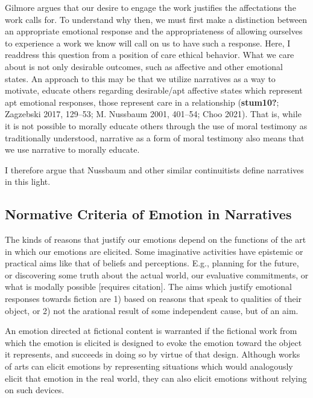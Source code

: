 \documentclass[12pt]{book}
\theoremstyle{definition}
\theoremstyle{remark}
\begin{document}
Gilmore argues that our desire to engage the work justifies the affectations the work calls for. To understand why then, we must first make a distinction between an appropriate emotional response and the appropriateness of allowing ourselves to experience a work we know will call on us to have such a response. Here, I readdress this question from a position of care ethical behavior. What we care about is not only desirable outcomes, such as affective and other emotional states. An approach to this may be that we utilize narratives as a way to motivate, educate others regarding desirable/apt affective states which represent apt emotional responses, those represent care in a relationship (\textbf{stum10?}; Zagzebski 2017, 129--53; M. Nussbaum 2001, 401--54; Choo 2021). That is, while it is not possible to morally educate others through the use of moral testimony as traditionally understood, narrative as a form of moral testimony also means that we use narrative to morally educate.

I therefore argue that Nussbaum and other similar continuitists define narratives in this light.

\subsection*{Normative Criteria of Emotion in Narratives}\label{normative-criteria-of-emotion-in-narratives}

The kinds of reasons that justify our emotions depend on the functions of the art in which our emotions are elicited. Some imaginative activities have epistemic or practical aims like that of beliefs and perceptions. E.g., planning for the future, or discovering some truth about the actual world, our evaluative commitments, or what is modally possible {[}requires citation{]}. The aims which justify emotional responses towards fiction are 1) based on reasons that speak to qualities of their object, or 2) not the arational result of some independent cause, but of an aim.

An emotion directed at fictional content is warranted if the fictional work from which the emotion is elicited is designed to evoke the emotion toward the object it represents, and succeeds in doing so by virtue of that design. Although works of arts can elicit emotions by representing situations which would analogously elicit that emotion in the real world, they can also elicit emotions without relying on such devices.
\end{document}
